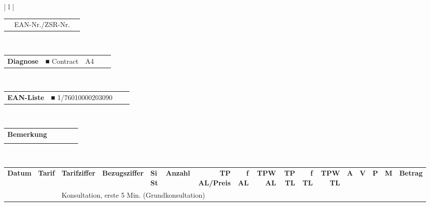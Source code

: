 \documentclass[a4paper,oneside,8pt]{extletter}
\makeatletter
\newenvironment{headerbox}
  {
    \begin{tabular}{p{2.0cm} p{2.6cm} @{ ■ } p{2.9cm} p{4cm} p{5.8cm}}
  }
  {
    \end{tabular}
  }
\newcommand{\headerboxend}{
  \end{headerbox}\\
  \hline
}
\makeatother
\begin{document}
\begin{tabular}{| l |}
\begin{headerbox}
\begin{headerbox}
  \begin{headerbox}
    \textbf{Auftraggeber}          & EAN-Nr./ZSR-Nr. & \multicolumn{3}{l}{}\\
  \headerboxend

  \begin{headerbox}
    \textbf{Diagnose}          & ■ Contract & A4\\
  \headerboxend

  \begin{headerbox}
    \textbf{EAN-Liste}          & \multicolumn{2}{l}{■ 1/76010000203090}\\
  \headerboxend

  \begin{headerbox}
    \textbf{Bemerkung}\\
    \\
  \headerboxend
\end{tabular}

\newcommand{\head}[1]{
  \textbf{#1}&
}

\setlength{\tabcolsep}{0.5em}
\begin{tabular}{@{} lllllrrrrrrrccccr @{}}
\head{Datum}
\head{Tarif}
\head{Tarifziffer}
\head{Bezugsziffer}
\head{Si St}
\head{Anzahl}
\head{TP AL/Preis}
\head{f AL}
\head{TPW AL}
\head{TP TL}
\head{f TL}
\head{TPW TL}
\head{A}
\head{V}
\head{P}
\head{M}
\textbf{Betrag}
\\
\multicolumn{2}{l}{}&
\multicolumn{15}{l}{Konsultation, erste 5 Min. (Grundkonsultation)}
\\
\end{tabular}
\end{document}
